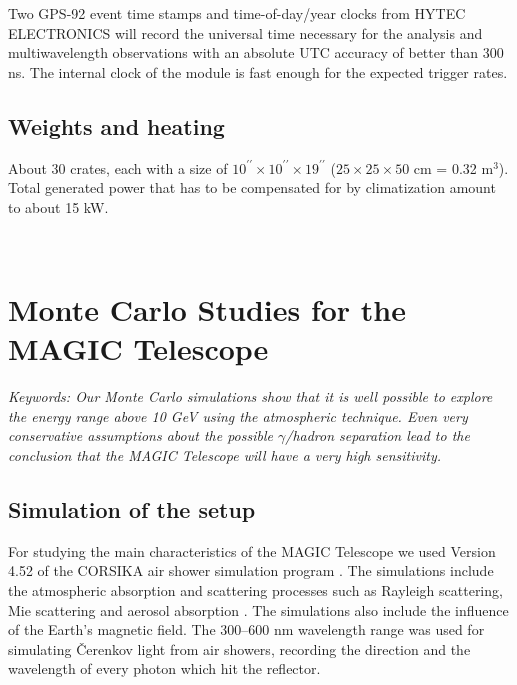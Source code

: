 Two GPS-92 event time stamps and time-of-day/year clocks from HYTEC
ELECTRONICS will record the universal time necessary for 
the analysis and multiwavelength
observations with an absolute UTC accuracy of better than 300 ns. The
internal clock of the module is fast enough for the expected trigger rates.

\section{Weights and heating}

About 30 crates, each with a size of $10^{\prime\prime}\times
10^{\prime\prime}\times 19^{\prime\prime}$ ($25 \times 25 \times 50$ cm =
0.32 m$^3$). Total generated power that has to be compensated for by 
climatization amount to about 15 kW.
\newpage

\hspace{3cm}
\vfill
\newpage
\begin{figure}[htb]
\leavevmode
\begin{center}
\epsfxsize=14cm
\end{center}
\end{figure}
~

\chapter{Monte Carlo Studies for the MAGIC Telescope}

\label{chap-6}

{\it Keywords: Our Monte Carlo simulations show that it is well possible
to explore the energy range above 10 GeV using the atmospheric \Cerenkov 
technique. Even very conservative assumptions about the possible 
$\gamma$/hadron separation lead to the conclusion that the MAGIC Telescope
will have a very high sensitivity.}

\section{Simulation of the setup}

\medskip For studying the main characteristics of the MAGIC Telescope we used
Version 4.52 of the CORSIKA air shower simulation program
\cite{corsika:95}. The simulations include the atmospheric absorption and
scattering processes such as Rayleigh scattering, Mie scattering
and aerosol absorption \cite{gaisser:90}. The simulations also
include the influence of the Earth's magnetic field. The
300--600 nm wavelength range 
was used for simulating \v{C}erenkov light from air
showers, recording the direction and the wavelength of every photon
which hit the reflector.
        
